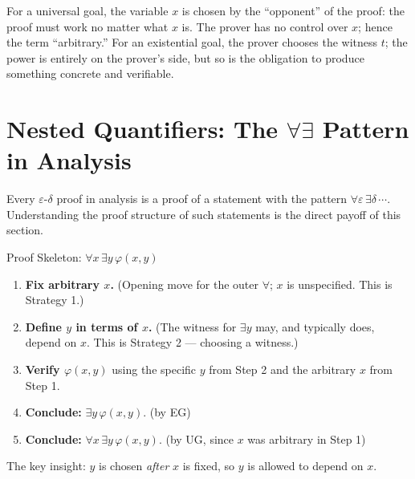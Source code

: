 \begin{remark*}
For a universal goal, the variable $x$ is chosen by the ``opponent'' of the
proof: the proof must work no matter what $x$ is. The prover has no control
over $x$; hence the term ``arbitrary.'' For an existential goal, the prover
chooses the witness $t$; the power is entirely on the prover's side, but so is
the obligation to produce something concrete and verifiable.
\end{remark*}


\section*{Nested Quantifiers: The $\forall\exists$ Pattern in Analysis}

\begin{exposition}
Every $\varepsilon$-$\delta$ proof in analysis is a proof of a statement with
the pattern $\forall\varepsilon\,\exists\delta\,\cdots$. Understanding the
proof structure of such statements is the direct payoff of this section.
\end{exposition}

\begin{propositionbox}{Proof Skeleton: $\forall x\,\exists y\,\varphi(x,y)$}
\begin{enumerate}[label=\textbf{Step \arabic*.}]
\item \textbf{Fix arbitrary $x$.} \quad (Opening move for the outer $\forall$; $x$ is
  unspecified. This is Strategy 1.)
\item \textbf{Define $y$ in terms of $x$.} \quad (The witness for $\exists y$ may, and
  typically does, depend on $x$. This is Strategy 2 — choosing a witness.)
\item \textbf{Verify $\varphi(x,y)$} \quad using the specific $y$ from Step 2 and
  the arbitrary $x$ from Step 1.
\item \textbf{Conclude:} $\exists y\,\varphi(x,y)$. \quad (by EG)
\item \textbf{Conclude:} $\forall x\,\exists y\,\varphi(x,y)$. \quad (by UG, since $x$
  was arbitrary in Step 1)
\end{enumerate}
The key insight: $y$ is chosen \emph{after} $x$ is fixed, so $y$ is allowed
to depend on $x$.
\end{propositionbox}

